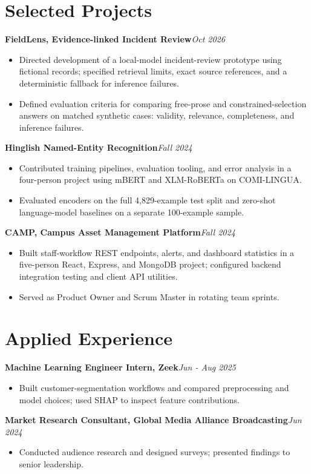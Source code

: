 \documentclass[a4paper,11pt]{article}
\newcommand{\entry}[2]{\textbf{#1}\hfill\textit{#2}}
\begin{document}
\section*{Selected Projects}
\entry{FieldLens, Evidence-linked Incident Review}{Oct 2026}
\begin{itemize}
\item Directed development of a local-model incident-review prototype using fictional records; specified retrieval limits, exact source references, and a deterministic fallback for inference failures.
\item Defined evaluation criteria for comparing free-prose and constrained-selection answers on matched synthetic cases: validity, relevance, completeness, and inference failures.
\end{itemize}

\entry{Hinglish Named-Entity Recognition}{Fall 2024}
\begin{itemize}
\item Contributed training pipelines, evaluation tooling, and error analysis in a four-person project using mBERT and XLM-RoBERTa on COMI-LINGUA.
\item Evaluated encoders on the full 4,829-example test split and zero-shot language-model baselines on a separate 100-example sample.
\end{itemize}

\entry{CAMP, Campus Asset Management Platform}{Fall 2024}
\begin{itemize}
\item Built staff-workflow REST endpoints, alerts, and dashboard statistics in a five-person React, Express, and MongoDB project; configured backend integration testing and client API utilities.
\item Served as Product Owner and Scrum Master in rotating team sprints.
\end{itemize}

\section*{Applied Experience}
\entry{Machine Learning Engineer Intern, Zeek}{Jun - Aug 2025}
\begin{itemize}
\item Built customer-segmentation workflows and compared preprocessing and model choices; used SHAP to inspect feature contributions.
\end{itemize}
\entry{Market Research Consultant, Global Media Alliance Broadcasting}{Jun 2024}
\begin{itemize}
\item Conducted audience research and designed surveys; presented findings to senior leadership.
\end{itemize}
\end{document}
